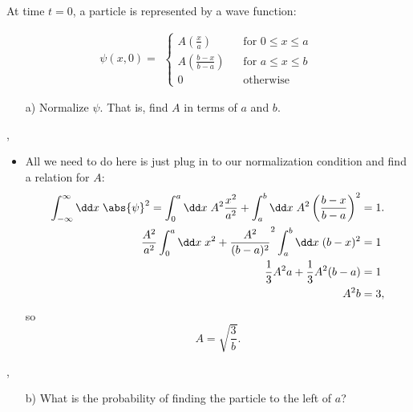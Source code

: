 \begin{example}
    At time $t=0$, a particle is represented by a wave function:

    \begin{equation}
        \psi(x,0) = 
            \begin{alignedat}{1}
            \begin{cases}
                A\left(\frac{x}{a}\right) \qquad &\text{for } 0 \leq x \leq a \\
                A\left(\frac{b-x}{b-a}\right) &\text{for } a \leq x \leq b \\
                0 &\text{otherwise}
            \end{cases}
            \end{alignedat}
    \end{equation}

    \begin{itemize}
        \item[a)] Normalize $\psi$. That is, find $A$ in terms of $a$ and $b$. 
    \end{itemize}

    \sep

    \begin{itemize}
        \item All we need to do here is just plug in to our normalization condition and find a relation for $A$:
            \begin{align}
                \int_{-\infty}^{\infty} \dd x\; \abs{\psi}^2 = \int_0^a \dd x\; A^2 \frac{x^2}{a^2} + \int_a^b \dd x\; A^2 \left(\frac{b-x}{b-a}\right)^2 &= 1. \\
                \frac{A^2}{a^2}\int_0^a \dd x\; x^2 + \frac{A^2}{(b-a)^2}^2\int_a^b \dd x\; (b-x)^2 &= 1 \\
                \frac{1}{3} A^2 a + \frac{1}{3} A^2(b-a) &= 1 \\
                A^2 b &= 3,
            \end{align}
            so
            \begin{equation}
                \boxed{A = \sqrt{\frac{3}{b}}}.
            \end{equation}
    \end{itemize}

    \sep 

    \begin{itemize}
        \item[b)] What is the probability of finding the particle to the left of $a$?
    \end{itemize}


\end{example}
